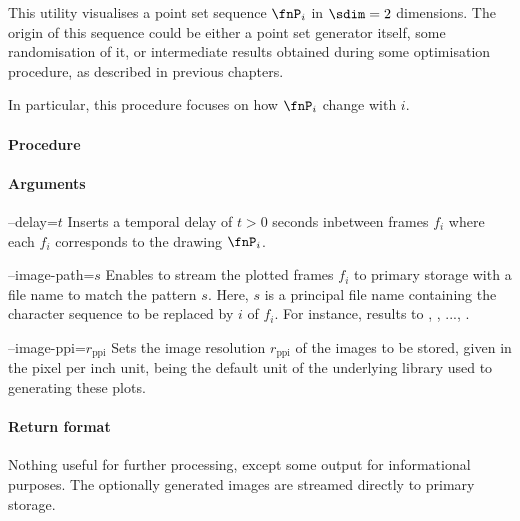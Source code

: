 %
This utility visualises a point set sequence $\fnP_i$ in $\sdim=2$ dimensions. The origin of this sequence could be either a point set generator itself, some randomisation of it, or intermediate results obtained during some optimisation procedure, as described in previous chapters.

In particular, this procedure focuses on how $\fnP_i$ change with $i$.

\paragraph{Procedure}

\begin{synopsis}
\end{synopsis}

\paragraph{Arguments}

\procarginseq{\ptseqsize}

\procargout

\begin{procarg}{--delay=$t$}
  Inserts a temporal delay of $t > 0$ seconds inbetween frames $f_i$ where each $f_i$ corresponds to the drawing $\fnP_i$.
\end{procarg}

\begin{procarg}{--image-path=$s$}
  Enables to stream the plotted frames $f_i$ to primary storage with a file name to match the pattern $s$. Here, $s$ is a principal file name containing the character sequence  to be replaced by $i$ of $f_i$. For instance,  results to , , ..., .
\end{procarg}

\begin{procarg}{--image-ppi=$r_{\text{ppi}}$}
  Sets the image resolution $r_{\text{ppi}}$ of the images to be stored, given in the pixel per inch unit, being the default unit of the underlying library used to generating these plots.
\end{procarg}

\procargsilent


\paragraph{Return format}

Nothing useful for further processing, except some output for informational purposes. The optionally generated images are streamed directly to primary storage.
